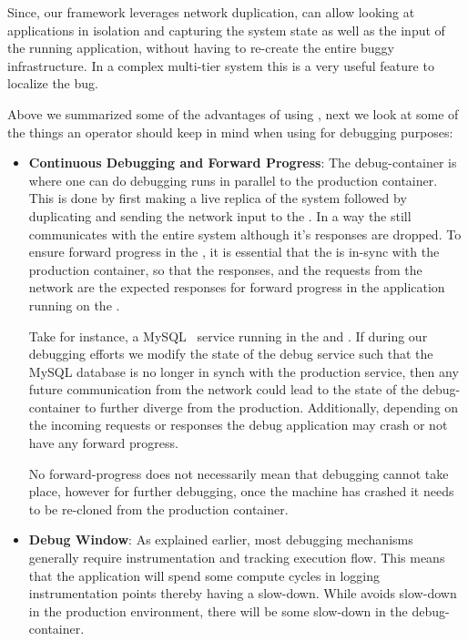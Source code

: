 \begin{itemize}
	Since, our framework leverages network duplication, \parikshan can allow looking at applications in isolation and capturing the system state as well as the input of the running application, without having to re-create the entire buggy infrastructure. 
	In a complex multi-tier system this is a very useful feature to localize the bug.\\
	
	
\end{itemize}

\noindent Above we summarized some of the advantages of using \parikshan, next we look at some of the things an operator should keep in mind when using \parikshan for debugging purposes:

\begin{itemize}
	\item \textbf{Continuous Debugging and Forward Progress}:
	The debug-container is where one can do debugging runs in parallel to the production container. This is done by first making a live replica of the system followed by duplicating and sending the network input to the \debugcontainer. 
	In a way the \debugcontainer still communicates with the entire system although it's responses are dropped. 
	To ensure forward progress in the \debugcontainer, it is essential that the \debugcontainer is in-sync with the production container, so that the responses, and the requests from the network are the expected responses for forward progress in the application running on the \debugcontainer.
	
	Take for instance, a MySQL~\cite{mysql} service running in the \productioncontainer and \debugcontainer. If during our debugging efforts we modify the state of the debug service such that the MySQL database is no longer in synch with the production service, then any future communication from the network could lead to the state of the debug-container to further diverge from the production. Additionally, depending on the incoming requests or responses the debug application may crash or not have any forward progress.
	
	No forward-progress does not necessarily mean that debugging cannot take place, however for further debugging, once the machine has crashed it needs to be re-cloned from the production container. 
	
	\item \textbf{Debug Window}:
	As explained earlier, most debugging mechanisms generally require instrumentation and tracking execution flow. This means that the application will spend some compute cycles in logging instrumentation points thereby having a slow-down. 
	While \parikshan avoids slow-down in the production environment, there will be some slow-down in the debug-container. 
	

\end{itemize}
